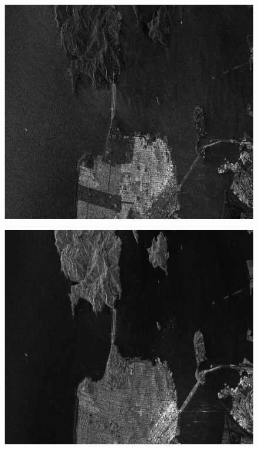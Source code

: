 \begin{center}
  \begin{figure}[h!]
    \includegraphics[width=\textwidth]{../Art/RSAT2_HH_Frisco.png}
    \label{fig:hhfrisco}
   \end{figure}
   
   \begin{figure}[h!]
    \includegraphics[width=\textwidth]{../Art/RSAT2_HV_Frisco.png}
    \label{fig:hvfrisco}
   \end{figure}
      

\end{center}
